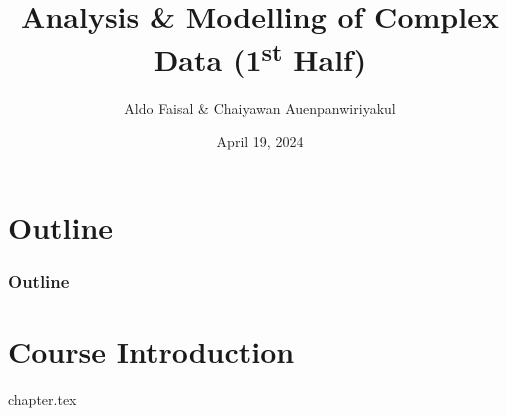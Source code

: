 \documentclass{beamer}
\title{Analysis \& Modelling of Complex Data (1\textsuperscript{st} Half)}
\author{Aldo Faisal \& Chaiyawan Auenpanwiriyakul}
\institute{Universität Bayreuth}
\date{April 19, 2024}
\begin{document}
\frame{\titlepage}

\section{Outline}
\begin{frame}[allowframebreaks]
\frametitle{Outline}
\tableofcontents
\end{frame}

\section{Course Introduction}
{chapter.tex}


\end{document}

